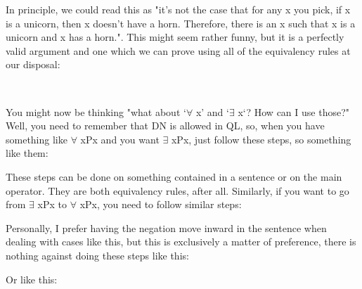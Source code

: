 In principle, we could read this as "it's not the case that for any x you pick, if x is a unicorn, then x doesn't have a horn. Therefore, there is an x such that x is a unicorn and x has a horn.". This might seem rather funny, but it is a perfectly valid argument and one which we can prove using all of the equivalency rules at our disposal:
\begin{fitchproof}
 
\end{fitchproof}
You might now be thinking "what about `\enot $\forall$ x\enot' and `\enot $\exists$ x\enot`? How can I use those?" Well, you need to remember that DN is allowed in QL, so, when you have something like \enot $\forall$ x\enot Px and you want $\exists$ xPx, just follow these steps, so something like them:
\begin{fitchproof}
\end{fitchproof}
These steps can be done on something contained in a sentence or on the main operator. They are both equivalency rules, after all. Similarly, if you want to go from \enot $\exists$ x\enot Px to $\forall$ xPx, you need to follow similar steps:
\begin{fitchproof}
\end{fitchproof}

Personally, I prefer having the negation move inward in the sentence when dealing with cases like this, but this is exclusively a matter of preference, there is nothing against doing these steps like this: 
\begin{fitchproof}
\end{fitchproof}

Or like this:
\begin{fitchproof}
\end{fitchproof}

\barcan

